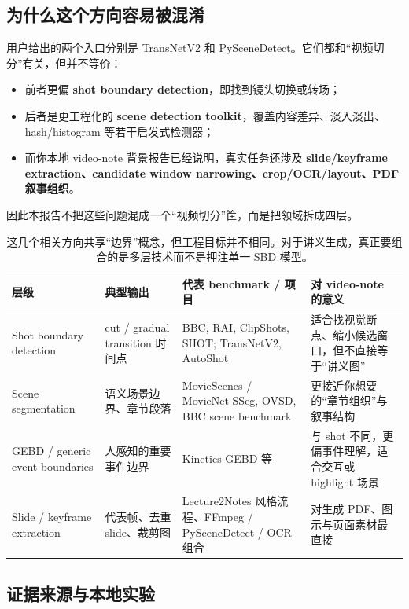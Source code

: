 \documentclass[a4paper]{article}
\begin{document}
\subsection{为什么这个方向容易被混淆}

用户给出的两个入口分别是 \href{https://github.com/soCzech/TransNetV2/blob/master/README.md}{TransNetV2} 和 \href{https://www.scenedetect.com/}{PySceneDetect}。它们都和“视频切分”有关，但并不等价：

\begin{itemize}
\item 前者更偏 \textbf{shot boundary detection}，即找到镜头切换或转场；
\item 后者是更工程化的 \textbf{scene detection toolkit}，覆盖内容差异、淡入淡出、hash/histogram 等若干启发式检测器；
\item 而你本地 video-note 背景报告已经说明，真实任务还涉及 \textbf{slide/keyframe extraction、candidate window narrowing、crop/OCR/layout、PDF 叙事组织}。
\end{itemize}

因此本报告不把这些问题混成一个“视频切分”筐，而是把领域拆成四层。

\begin{table}[H]
\centering
\small
\begin{tabularx}{\textwidth}{p{2.8cm}p{3.0cm}p{2.8cm}Y}
\toprule
层级 & 典型输出 & 代表 benchmark / 项目 & 对 video-note 的意义 \\
\midrule
Shot boundary detection & cut / gradual transition 时间点 & BBC, RAI, ClipShots, SHOT; TransNetV2, AutoShot & 适合找视觉断点、缩小候选窗口，但不直接等于“讲义图” \\
Scene segmentation & 语义场景边界、章节段落 & MovieScenes / MovieNet-SSeg, OVSD, BBC scene benchmark & 更接近你想要的“章节组织”与叙事结构 \\
GEBD / generic event boundaries & 人感知的重要事件边界 & Kinetics-GEBD 等 & 与 shot 不同，更偏事件理解，适合交互或 highlight 场景 \\
Slide / keyframe extraction & 代表帧、去重 slide、裁剪图 & Lecture2Notes 风格流程、FFmpeg / PySceneDetect / OCR 组合 & 对生成 PDF、图示与页面素材最直接 \\
\bottomrule
\end{tabularx}
\caption{这几个相关方向共享“边界”概念，但工程目标并不相同。对于讲义生成，真正要组合的是多层技术而不是押注单一 SBD 模型。}
\end{table}

\subsection{证据来源与本地实验}
\end{document}
